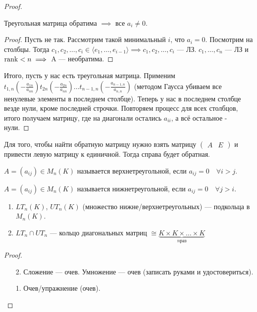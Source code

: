 \begin{proof}
    \begin{statement}
        Треугольная матрица обратима $\implies$ все  $a_i \neq 0$.
    \end{statement}
    \begin{proof}
        Пусть не так. Рассмотрим такой минимальный $i$, что  $a_i = 0$. Посмотрим на столбцы. Тогда  $c_1, c_2, \ldots, c_i \in \langle e_1, \ldots, e_{i-1} \rangle \implies c_1, c_2, \ldots, c_i$ --- ЛЗ. $c_1,\ldots,c_n$ --- ЛЗ и $\operatorname{rank} < n \implies$ A --- необратима.
    \end{proof}
    Итого, пусть у нас есть треугольная матрица. Применим $t_{1, n}(-\frac{a_{1n}}{a_{nn}})t_{2n}(-\frac{a_{2n}}{a_{nn}})\ldots t_{n-1,n}(-\frac{a_{n-1,n}}{a_{n,n}})$ (методом Гаусса убиваем все ненулевые элементы в последнем столбце). Теперь у нас в последнем столбце везде нули, кроме последней строчки. Повторяем процесс для всех столбцов, итого получаем матрицу, где на диагонали остались $a_{ii}$, а всё остальное - нули.
\end{proof}
\begin{statement}
    Для того, чтобы найти обратную матрицу нужно взять матрицу $\left(\begin{array}{c|c} A & E \end{array}\right)$ и привести левую матрицу к единичной. Тогда справа будет обратная.
\end{statement}
\begin{definition}
    $A = (a_{ij}) \in M_n(K)$ называется верхнетреугольной, если  $a_{ij} = 0 \quad \forall i > j$.

     $A = (a_{ij}) \in M_n(K)$ называется нижнетреугольной, если  $a_{ij} = 0 \quad \forall j > i$.
\end{definition}
\begin{statement}
    \begin{enumerate}
        \item $LT_n(K)$,  $UT_n(K)$ (множество нижне/верхнетреугольных) --- подкольца в  $M_n(K)$.
        \item $LT_n \cap UT_n$ --- кольцо диагональных матриц  $\cong \underbrace{K \times K \times \ldots \times K}_{n \text{раз}}$
    \end{enumerate}
\end{statement}
\begin{proof}
    \slashn
    \begin{enumerate}
        \item[2.] Сложение --- очев. Умножение --- очев (записать руками и удостовериться).
        \item [1.] Очев/упражнение (очев). 
    \end{enumerate}
\end{proof}
